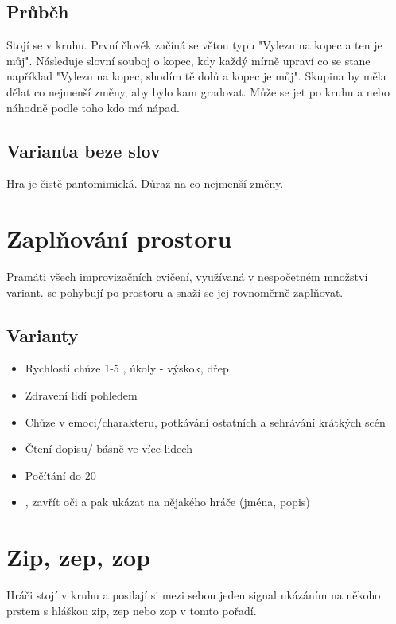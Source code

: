 \subsection{Průběh} Stojí se v kruhu. První člověk začíná se větou typu "Vylezu na kopec a ten je můj". Následuje slovní souboj o kopec, kdy každý mírně upraví co se stane například "Vylezu na kopec, shodím tě dolů a kopec je můj". Skupina by měla dělat co nejmenší změny, aby bylo kam gradovat. Může se jet po kruhu a nebo náhodně podle toho kdo má nápad.  
 
\subsection{Varianta beze slov} Hra je čistě pantomimická. Důraz na co nejmenší změny. 
 
 
 
 
 
\needspace{5cm} \section{Zaplňování prostoru} \label{zaplňování prostoru} Pramáti všech improvizačních cvičení, využívaná v nespočetném množství variant.  se pohybují po prostoru a snaží se jej rovnoměrně zaplňovat. 
 
\subsection{Varianty} \begin{itemize}
\item Rychlosti chůze  1-5 , úkoly - výskok, dřep
\item Zdravení lidí pohledem
\item Chůze v emoci/charakteru, potkávání ostatních a sehrávání krátkých scén
\item Čtení dopisu/ básně ve více lidech
\item Počítání do 20
\item {}, zavřít oči a pak ukázat na nějakého hráče (jména, popis)
\end{itemize}
 
 
 
\needspace{5cm} \section{Zip, zep, zop} \label{zip, zep, zop} Hráči stojí v kruhu a posilají si mezi sebou jeden signal ukázáním na někoho prstem s hláškou zip, zep nebo zop v tomto pořadí. 
 
